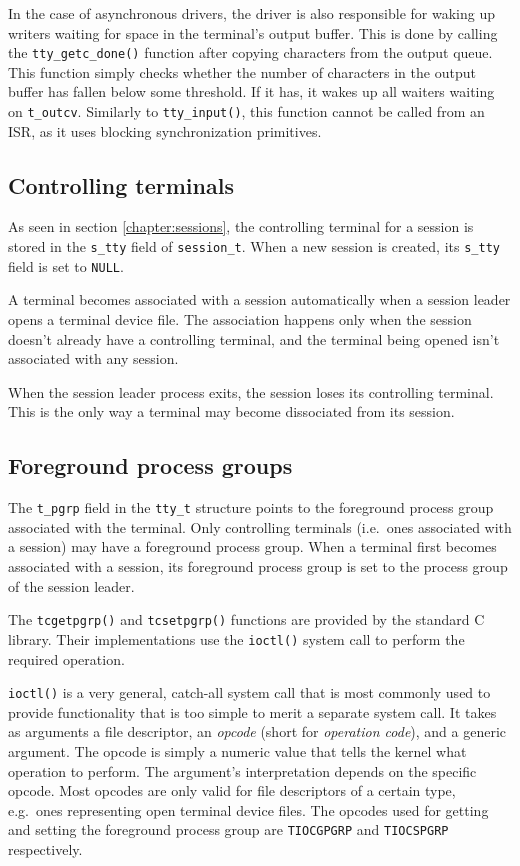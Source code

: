 \documentclass[shortabstract, manyadvisors, english, mgr]{iithesis}
\begin{document}
In the case of asynchronous drivers, the driver is also responsible for waking
up writers waiting for space in the terminal's output buffer. This is done by
calling the \texttt{tty\_getc\_done()} function after copying characters from
the output queue. This function simply checks whether the number of characters
in the output buffer has fallen below some threshold. If it has, it wakes up all
waiters waiting on \texttt{t\_outcv}. Similarly to \texttt{tty\_input()}, this
function cannot be called from an ISR, as it uses blocking synchronization
primitives.

\subsection{Controlling terminals}

As seen in section \ref{chapter:sessions}, the controlling terminal for a
session is stored in the \texttt{s\_tty} field of \texttt{session\_t}. When a
new session is created, its \texttt{s\_tty} field is set to \texttt{NULL}.

A terminal becomes associated with a session automatically when a session leader
opens a terminal device file. The association happens only when the session
doesn't already have a controlling terminal, and the terminal being opened isn't
associated with any session.

When the session leader process exits, the session loses its controlling
terminal. This is the only way a terminal may become dissociated from its
session.

\subsection{Foreground process groups}

The \texttt{t\_pgrp} field in the \texttt{tty\_t} structure points to the
foreground process group associated with the terminal. Only controlling
terminals (i.e.\ ones associated with a session) may have a foreground process
group. When a terminal first becomes associated with a session, its foreground
process group is set to the process group of the session leader.

The \texttt{tcgetpgrp()} and \texttt{tcsetpgrp()} functions are provided by the
standard C library. Their implementations use the \texttt{ioctl()} system call
to perform the required operation.

\texttt{ioctl()} is a very general, catch-all system call that is most commonly
used to provide functionality that is too simple to merit a separate system
call. It takes as arguments a file descriptor, an \textit{opcode} (short for
\textit{operation code}), and a generic argument. The opcode is simply a numeric
value that tells the kernel what operation to perform. The argument's
interpretation depends on the specific opcode. Most opcodes are only valid for
file descriptors of a certain type, e.g.\ ones representing open terminal device
files. The opcodes used for getting and setting the foreground process group are
\texttt{TIOCGPGRP} and \texttt{TIOCSPGRP} respectively.
\end{document}
